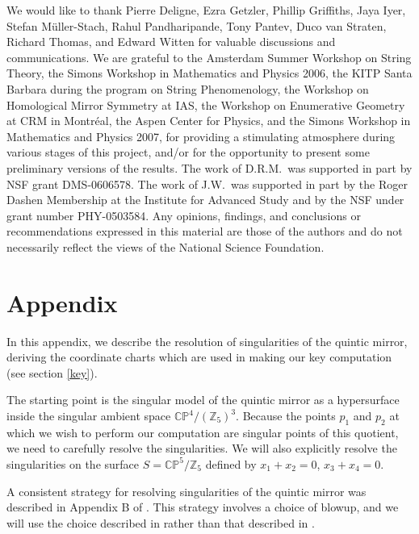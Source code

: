 \begin{acknowledgments}
We would like to thank Pierre Deligne, Ezra Getzler, Phillip Griffiths, Jaya 
Iyer, Stefan M\"uller-Stach, Rahul Pandharipande, Tony Pantev, Duco van 
Straten, Richard Thomas, and Edward Witten for valuable discussions and 
communications. We are grateful to the Amsterdam Summer Workshop on String
Theory, the Simons Workshop in Mathematics
and Physics 2006, the KITP Santa Barbara during the program on String
Phenomenology, the Workshop on Homological Mirror Symmetry at IAS, the
Workshop on Enumerative Geometry at CRM in Montr\'eal, the 
Aspen Center for Physics, and the Simons Workshop in Mathematics and Physics 
2007, for providing a stimulating atmosphere during various stages of this 
project, and/or for the opportunity to present some preliminary versions 
of the results. The work of D.R.M.\ was supported in part by NSF
grant DMS-0606578. The work of J.W.\ was supported 
in part by the Roger Dashen Membership at the Institute for Advanced 
Study and by the NSF under grant number PHY-0503584.
Any opinions, findings, and conclusions or recommendations expressed in this 
material are those of the authors
and do not necessarily reflect the views of the National Science Foundation. 
\end{acknowledgments}

\section*{Appendix}

In this appendix, we describe the resolution of singularities of the
quintic mirror, deriving the coordinate charts which are used in
making our key computation (see section \ref{key}).

The starting point is the singular model of the quintic mirror as
a hypersurface inside the singular ambient
space $\mathbb{CP}^4/(\mathbb{Z}_5)^3$.
Because the points $p_1$ and $p_2$ at which we wish to perform our
computation are singular points of this quotient, we need to carefully
resolve the singularities.  We will also explicitly resolve the
singularities on the surface $S=\mathbb{CP}^5/\mathbb{Z}_5$ defined by
$x_1+x_2=0$, $x_3+x_4=0$.

A consistent strategy for resolving singularities of the quintic mirror
was described in
Appendix B of \cite{guide}.  This strategy involves a choice of blowup,
and we will use the choice  described in \cite{geomaspects} rather than
that described in \cite{guide}.  

